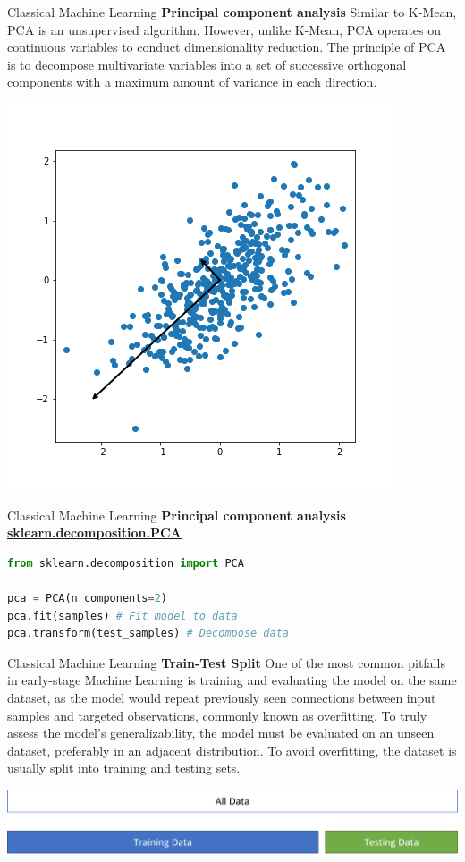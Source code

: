 \documentclass{beamer}
\begin{document}
\begin{frame}[fragile]{Classical Machine Learning}
    \textbf{Principal component analysis}
    Similar to K-Mean, PCA is an unsupervised algorithm. However, unlike K-Mean, PCA operates on continuous variables to conduct dimensionality reduction. The principle of PCA is to decompose multivariate variables into a set of successive orthogonal components with a maximum amount of variance in each direction.
    \begin{center}
        \includegraphics[width=.40\textwidth,height=\textheight,keepaspectratio]{figures/PCA.png}
    \end{center}
\end{frame}
\begin{frame}[fragile]{Classical Machine Learning}
    \textbf{Principal component analysis}
    \href{https://scikit-learn.org/stable/modules/generated/sklearn.decomposition.PCA.html}{\textbf{\underline{sklearn.decomposition.PCA}}}
    \begin{example}
        \begin{lstlisting}[language=Python]
from sklearn.decomposition import PCA

pca = PCA(n_components=2)
pca.fit(samples) # Fit model to data
pca.transform(test_samples) # Decompose data
        \end{lstlisting}
    \end{example}
\end{frame}
\begin{frame}[fragile]{Classical Machine Learning}
    \textbf{Train-Test Split}
    One of the most common pitfalls in early-stage Machine Learning is training and evaluating the model on the same dataset, as the model would repeat previously seen connections between input samples and targeted observations, commonly known as overfitting. To truly assess the model's generalizability, the model must be evaluated on an unseen dataset, preferably in an adjacent distribution. To avoid overfitting, the dataset is usually split into training and testing sets.
    \begin{center}
        \includegraphics[width=\textwidth,height=\textheight,keepaspectratio]{figures/Train-Test split.png}
    \end{center}
\end{frame}
\end{document}

